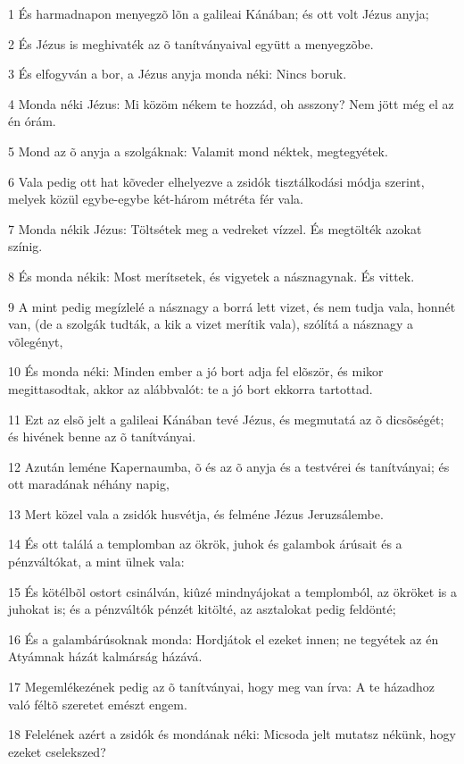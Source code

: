 \par 1 És harmadnapon menyegzõ lõn a galileai Kánában; és ott volt Jézus anyja;
\par 2 És Jézus is meghivaték az õ tanítványaival együtt a menyegzõbe.
\par 3 És elfogyván a bor, a Jézus anyja monda néki: Nincs boruk.
\par 4 Monda néki Jézus: Mi közöm nékem te hozzád, oh asszony? Nem jött még el az én órám.
\par 5 Mond az õ anyja a szolgáknak: Valamit mond néktek, megtegyétek.
\par 6 Vala pedig ott hat kõveder elhelyezve a zsidók tisztálkodási módja szerint, melyek közül egybe-egybe két-három métréta fér vala.
\par 7 Monda nékik Jézus: Töltsétek meg a vedreket vízzel. És megtölték azokat színig.
\par 8 És monda nékik: Most merítsetek, és vigyetek a násznagynak. És vittek.
\par 9 A mint pedig megízlelé a násznagy a borrá lett vizet, és nem tudja vala, honnét van, (de a szolgák tudták, a kik a vizet merítik vala), szólítá a násznagy a võlegényt,
\par 10 És monda néki: Minden ember a jó bort adja fel elõször, és mikor megittasodtak, akkor az alábbvalót: te a jó bort ekkorra tartottad.
\par 11 Ezt az elsõ jelt a galileai Kánában tevé Jézus, és megmutatá az õ dicsõségét; és hivének benne az õ tanítványai.
\par 12 Azután leméne Kapernaumba, õ és az õ anyja és a testvérei és tanítványai; és ott maradának néhány napig,
\par 13 Mert közel vala a zsidók husvétja, és felméne Jézus Jeruzsálembe.
\par 14 És ott találá a templomban az ökrök, juhok és galambok árúsait és a pénzváltókat, a mint ülnek vala:
\par 15 És kötélbõl ostort csinálván, kiûzé mindnyájokat a templomból, az ökröket is a juhokat is; és a pénzváltók pénzét kitölté, az asztalokat pedig feldönté;
\par 16 És a galambárúsoknak monda: Hordjátok el ezeket innen; ne tegyétek az én Atyámnak házát kalmárság házává.
\par 17 Megemlékezének pedig az õ tanítványai, hogy meg van írva: A te házadhoz való féltõ szeretet emészt engem.
\par 18 Felelének azért a zsidók és mondának néki: Micsoda jelt mutatsz nékünk, hogy ezeket cselekszed?
